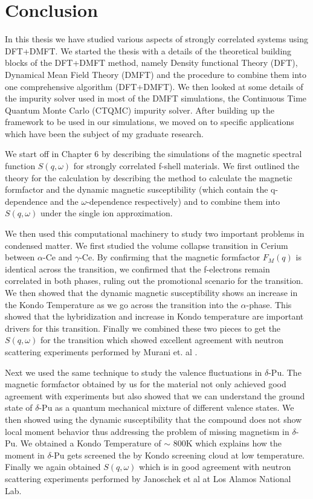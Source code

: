 \documentclass[10pt]{ruthesis}
\begin{document}
{\pagebreak
\chapter{Conclusion}

In this thesis we have studied various aspects of strongly correlated systems using DFT+DMFT. We started the thesis with a details of the theoretical building blocks of the DFT+DMFT method, namely Density functional Theory (DFT), Dynamical Mean Field Theory (DMFT) and the procedure to combine them into one comprehensive algorithm (DFT+DMFT). We then looked at some details of the impurity solver used in most of the DMFT simulations, the Continuous Time Quantum Monte Carlo (CTQMC) impurity solver. After building up the framework to be used in our simulations, we moved on to specific applications which have been the subject of my graduate research.

We start off in Chapter 6 by describing the simulations of the magnetic spectral function $S(q,\omega)$ for strongly correlated f-shell materials. We first outlined the theory for the calculation by describing the method to calculate the magnetic formfactor and the dynamic magnetic susceptibility (which contain the q-dependence and the $\omega$-dependence respectively)  and to combine them into $S(q,\omega)$ under the single ion approximation. 

We then used this computational machinery to study two important problems in condensed matter. We first studied the volume collapse transition in Cerium between $\alpha$-Ce and $\gamma$-Ce. By confirming that the magnetic formfactor $F_M(q)$ is identical across the transition, we confirmed that the f-electrons remain correlated in both phases, ruling out the promotional scenario for the transition. We then showed that the dynamic magnetic susceptibility shows an increase in the Kondo Temperature as we go across the transition into the $\alpha$-phase. This showed that the hybridization and  increase in Kondo temperature are important drivers for this transition. Finally we combined these two pieces to get the $S(q,\omega)$ for the transition which showed excellent agreement with neutron scattering experiments performed by Murani et. al \cite{murani}.

Next we used the same technique to study the valence fluctuations in $\delta$-Pu. The magnetic formfactor obtained by us for the material not only achieved good agreement with experiments but also showed that we can understand the ground state of $\delta$-Pu as a quantum mechanical mixture of different valence states. We then showed using the dynamic susceptibility that the compound does not show local moment behavior thus addressing the problem of missing magnetism in $\delta$-Pu. We obtained a Kondo Temperature of $\sim$ 800K which explains how the moment in $\delta$-Pu gets screened the by Kondo screening cloud at low temperature. Finally we again obtained $S(q,\omega)$ which is in good agreement with neutron scattering experiments performed by Janoschek et al at Los Alamos National Lab.

}
\end{document}
